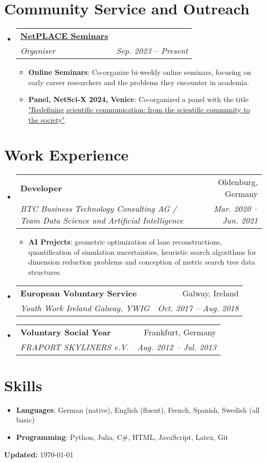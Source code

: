 \documentclass[letterpaper,11pt]{article}
\makeatletter
\newcommand{\resumeItem}[2]{
  \item\small{ \textbf{#1}{: #2 \vspace{-2pt}} } }
\newcommand{\resumeSubheading}[4]{ \vspace{-1pt}\item
    \begin{tabular*}{0.97\textwidth}{l@{\extracolsep{\fill}}r} \textbf{#1} & #2
      \\
      \textit{\small#3} & \textit{\small #4} \\
    \end{tabular*}\vspace{-5pt} }
\newcommand{\resumeSubItem}[2]{\resumeItem{#1}{#2}\vspace{-4pt}}
\newcommand{\resumeSubHeadingListStart}{\begin{itemize}[leftmargin=*]}
\newcommand{\resumeSubHeadingListEnd}{\end{itemize}}
\newcommand{\resumeItemListStart}{\begin{itemize}}
\newcommand{\resumeItemListEnd}{\end{itemize}\vspace{-5pt}}
\makeatother
\begin{document}
  \section{Community Service and Outreach}
  \resumeSubHeadingListStart

    \resumeSubheading {\href{https://www.netplace.site/about}{NetPLACE Seminars}}{}
      {Organiser}{Sep. 2023 -- Present} \resumeItemListStart
      \resumeItem{Online Seminars} {Co-organize bi-weekly online seminars,
      focusing on early career researchers and the problems they encounter in
      academia.} \resumeItem{Panel, NetSci-X 2024, Venice} {Co-organized a panel with
      the title
      \href{https://sites.google.com/view/netplace/panelsconferences/netscix2024?authuser=0}{"Redefining
      scientific communication: from the scientific community to the society"} }
      \resumeItemListEnd

  \resumeSubHeadingListEnd



\section{Work Experience}
  \resumeSubHeadingListStart

    \resumeSubheading {Developer}{Oldenburg, Germany} {BTC Business Technology
    Consulting AG / Team Data Science and Artificial Intelligence}{Mar. 2020 --
    Jun. 2021} \resumeItemListStart \resumeItem{AI Projects}{geometric
    optimization of lane reconstructions, quantification of simulation
    uncertainties, heuristic search algorithms for dimension reduction problems
    and conception of metric search tree data structures.} \resumeItemListEnd

    \resumeSubheading {European Voluntary Service}{Galway, Ireland} {Youth Work
    Ireland Galway, YWIG}{Oct. 2017 -- Aug. 2018}


    \resumeSubheading {Voluntary Social Year}{Frankfurt, Germany} {FRAPORT
    SKYLINERS e.V.}{Aug. 2012 -- Jul. 2013}

  \resumeSubHeadingListEnd




\section{Skills}
 \resumeSubHeadingListStart \resumeSubItem{Languages} {German (native), English
    (fluent), French, Spanish, Swedish (all basic)}

   \resumeSubItem{Programming} {Python, Julia, C\#, HTML, JavaScript, Latex,
   Git} \resumeSubHeadingListEnd

   \vfill
\begin{center}
    \raggedleft \textbf{Updated:} \today
\end{center}


\end{document}
